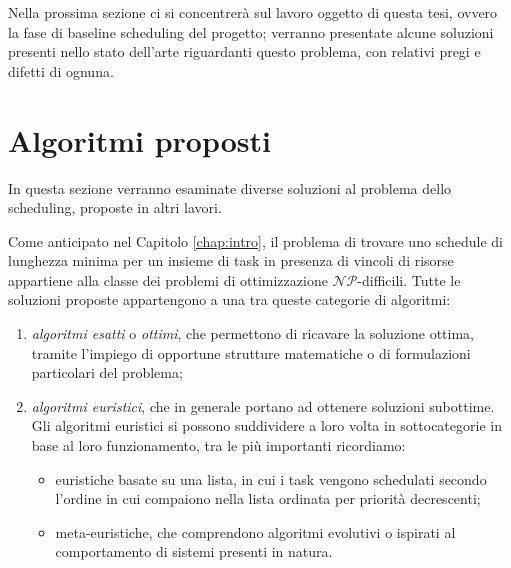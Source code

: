 Nella prossima sezione ci si concentrerà sul lavoro oggetto di questa tesi, 
ovvero la fase di baseline scheduling del progetto; verranno presentate alcune 
soluzioni presenti nello stato dell'arte riguardanti questo problema, con 
relativi pregi e difetti di ognuna.


\section{Algoritmi proposti}
\label{sec:algoritmiProposti}
In questa sezione verranno esaminate diverse soluzioni al problema dello 
scheduling, proposte in altri lavori.

Come anticipato nel Capitolo \ref{chap:intro}, il problema di trovare uno 
schedule di lunghezza minima per un insieme di task in presenza di vincoli di 
risorse appartiene alla classe dei problemi di ottimizzazione 
$\mathcal{NP}$-difficili. Tutte le soluzioni proposte appartengono a una 
tra queste categorie di algoritmi:
\begin{enumerate}
 \item \emph{algoritmi esatti} o \emph{ottimi}, che permettono di ricavare la 
soluzione ottima, tramite l'impiego di opportune strutture matematiche o di 
formulazioni particolari del problema;
 \item \emph{algoritmi euristici}, che in generale portano ad ottenere 
soluzioni subottime. Gli algoritmi euristici si possono suddividere a loro 
volta in sottocategorie in base al loro funzionamento, tra le più importanti 
ricordiamo:
 \begin{itemize}
  \item euristiche basate su una lista, in cui i task vengono schedulati 
secondo l'ordine in cui compaiono nella lista ordinata per priorità decrescenti;
  \item meta-euristiche, che comprendono algoritmi evolutivi o ispirati al 
comportamento di sistemi presenti in natura.
 \end{itemize}
\end{enumerate}


